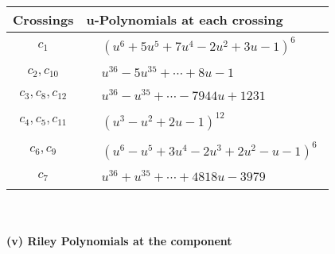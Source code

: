 \documentclass[1p]{elsarticle_modified}
\theoremstyle{definition}
\begin{document}
\begin{tabular}{m{50pt}|m{274pt}}
Crossings & \hspace{64pt}u-Polynomials at each crossing \\
\hline $$\begin{aligned}c_{1}\end{aligned}$$&$\begin{aligned}
&(u^6+5 u^5+7 u^4-2 u^2+3 u-1)^6
\end{aligned}$\\
\hline $$\begin{aligned}c_{2},c_{10}\end{aligned}$$&$\begin{aligned}
&u^{36}-5 u^{35}+\cdots+8 u-1
\end{aligned}$\\
\hline $$\begin{aligned}c_{3},c_{8},c_{12}\end{aligned}$$&$\begin{aligned}
&u^{36}- u^{35}+\cdots-7944 u+1231
\end{aligned}$\\
\hline $$\begin{aligned}c_{4},c_{5},c_{11}\end{aligned}$$&$\begin{aligned}
&(u^3- u^2+2 u-1)^{12}
\end{aligned}$\\
\hline $$\begin{aligned}c_{6},c_{9}\end{aligned}$$&$\begin{aligned}
&(u^6- u^5+3 u^4-2 u^3+2 u^2- u-1)^6
\end{aligned}$\\
\hline $$\begin{aligned}c_{7}\end{aligned}$$&$\begin{aligned}
&u^{36}+u^{35}+\cdots+4818 u-3979
\end{aligned}$\\
\hline
\end{tabular}\\~\\
\newpage\renewcommand{\arraystretch}{1}
\flushleft \textbf{(v) Riley Polynomials at the component}\newline \\
\end{document}
